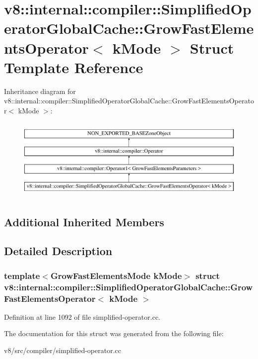 \hypertarget{structv8_1_1internal_1_1compiler_1_1SimplifiedOperatorGlobalCache_1_1GrowFastElementsOperator}{}\section{v8\+:\+:internal\+:\+:compiler\+:\+:Simplified\+Operator\+Global\+Cache\+:\+:Grow\+Fast\+Elements\+Operator$<$ k\+Mode $>$ Struct Template Reference}
\label{structv8_1_1internal_1_1compiler_1_1SimplifiedOperatorGlobalCache_1_1GrowFastElementsOperator}
Inheritance diagram for v8\+:\+:internal\+:\+:compiler\+:\+:Simplified\+Operator\+Global\+Cache\+:\+:Grow\+Fast\+Elements\+Operator$<$ k\+Mode $>$\+:\begin{figure}[H]
\begin{center}
\leavevmode
\includegraphics[height=4.000000cm]{structv8_1_1internal_1_1compiler_1_1SimplifiedOperatorGlobalCache_1_1GrowFastElementsOperator}
\end{center}
\end{figure}
\subsection*{Additional Inherited Members}


\subsection{Detailed Description}
\subsubsection*{template$<$Grow\+Fast\+Elements\+Mode k\+Mode$>$\newline
struct v8\+::internal\+::compiler\+::\+Simplified\+Operator\+Global\+Cache\+::\+Grow\+Fast\+Elements\+Operator$<$ k\+Mode $>$}



Definition at line 1092 of file simplified-\/operator.\+cc.



The documentation for this struct was generated from the following file\+:\begin{DoxyCompactItemize}
\item 
v8/src/compiler/simplified-\/operator.\+cc\end{DoxyCompactItemize}
